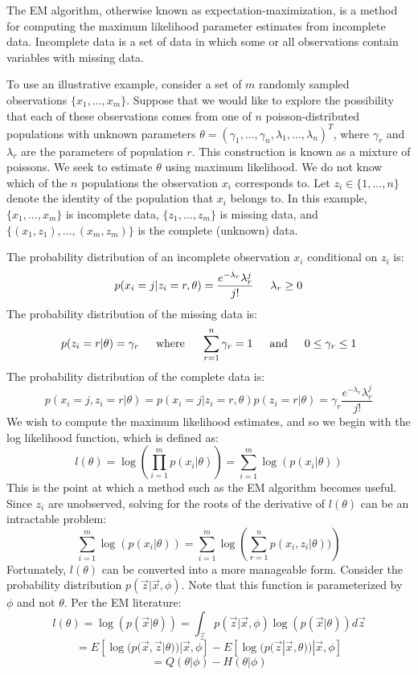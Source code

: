 \documentclass[letter,12pt]{article}
\begin{document}
The EM algorithm, otherwise known as expectation-maximization, is a method for computing the maximum likelihood parameter estimates from incomplete data.  Incomplete data is a set of data in which some or all observations contain variables with missing data.  

To use an illustrative example, consider a set of $m$ randomly sampled observations $\{x_1,...,x_m\}$.  Suppose that we would like to explore the possibility that each of these observations comes from one of $n$ poisson-distributed populations with unknown parameters $\theta=(\gamma_1,...,\gamma_n,\lambda_1,...,\lambda_n)^T$, where $\gamma_r$ and $\lambda_r$ are the parameters of population $r$.  This construction is known as a mixture of poissons.  We seek to estimate $\theta$ using maximum likelihood.  We do not know which of the $n$ populations the observation $x_i$ corresponds to.  Let $z_i \in \{1,...,n\}$ denote the identity of the population that $x_i$ belongs to.  In this example, $\{x_1,...,x_m\}$ is incomplete data, $\{z_1,...,z_m\}$ is missing data, and $\{(x_1,z_1),...,(x_m,z_m)\}$ is the complete (unknown) data.

The probability distribution of an incomplete observation $x_i$ conditional on $z_i$ is:
\[
p(x_i=j|z_i=r,\theta) = \frac{e^{-\lambda_r}\lambda_r^{j}}{j!}  
\indent
\lambda_r \geq 0
\]
The probability distribution of the missing data is:
\[
p(z_i=r|\theta) = \gamma_r
\indent
\text{where}
\indent 
\sum_{r=1}^{n}\gamma_r = 1
\indent
\text{and}
\indent 
0 \leq \gamma_r \leq 1
\]
The probability distribution of the complete data is:
\begin{equation} \label{eq_constraint}
p(x_i=j,z_i=r|\theta) 
= p(x_i=j|z_i=r,\theta)p(z_i=r|\theta) = \gamma_r\frac{e^{-\lambda_r}\lambda_r^{j}}{j!}
\end{equation}
We wish to compute the maximum likelihood estimates, and so we begin with the log likelihood function, which is defined as:
\[
l(\theta) = \log(\prod_{i=1}^{m}p(x_i|\theta)) = \sum_{i=1}^{m} \log(p(x_i|\theta))
\]
This is the point at which a method such as the EM algorithm becomes useful.  Since $z_i$ are unobserved, solving for the roots of the derivative of $l(\theta)$ can be an intractable problem:
\[
\sum_{i=1}^{m} \log(p(x_i|\theta)) = \sum_{i=1}^{m} \log\left(\sum_{r=1}^{n}p(x_i,z_i|\theta))\right)
\]
Fortunately, $l(\theta)$ can be converted into a more manageable form.  Consider the probability distribution $p(\vec{z}|\vec{x},\phi)$.  Note that this function is parameterized by $\phi$ and not $\theta$.  Per the EM literature:
\[
l(\theta) = \log(p(\vec{x}|\theta)) 
= \int_{\vec{z}}p(\vec{z}|\vec{x},\phi)\log(p(\vec{x}|\theta))d\vec{z}
\]
\[
=
E[\log(p(\vec{x},\vec{z}|\theta))|\vec{x},\phi]
-
E[\log(p(\vec{z}|\vec{x},\theta))|\vec{x},\phi]
\]
\begin{equation} \label{eq:QH}
=Q(\theta|\phi)
-H(\theta|\phi)
\end{equation}
\end{document}
